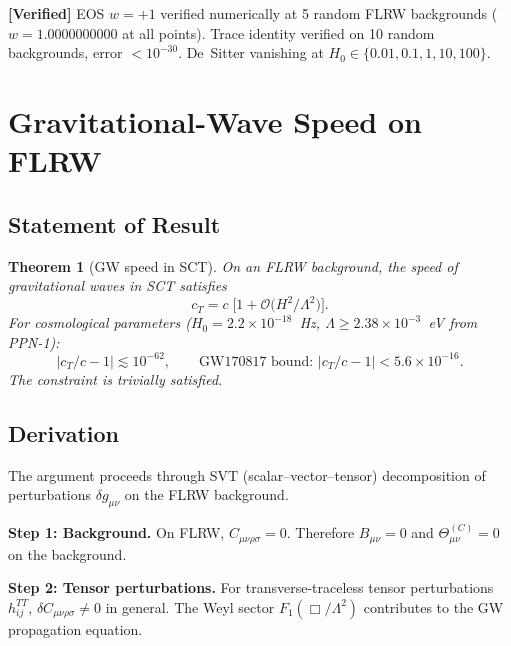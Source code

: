 \documentclass[11pt,a4paper]{article}
\theoremstyle{plain}
\newtheorem{theorem}{Theorem}[section]
\theoremstyle{definition}
\newcommand{\verified}[1]{%
  \par\smallskip\noindent
  \colorbox{green!10}{\parbox{\dimexpr\linewidth-2\fboxsep}{%
    \textcolor{green!50!black}{\textbf{[Verified]}} #1}}%
  \par\smallskip}
\begin{document}
\verified{EOS $w = +1$ verified numerically at 5 random FLRW backgrounds
($w = 1.0000000000$ at all points). Trace identity verified on 10 random
backgrounds, error $< 10^{-30}$. De~Sitter vanishing at
$H_0 \in \{0.01, 0.1, 1, 10, 100\}$.}

\section{Gravitational-Wave Speed on FLRW}\label{sec:gw}

\subsection{Statement of Result}

\begin{theorem}[GW speed in SCT]\label{thm:cT}
On an FLRW background, the speed of gravitational waves in SCT satisfies
\begin{equation}\label{eq:cT}
  \boxed{c_T = c\;\bigl[1 + \mathcal{O}\bigl(H^2/\Lambda^2\bigr)\bigr].}
\end{equation}
For cosmological parameters ($H_0 = 2.2 \times 10^{-18}$~Hz,
$\Lambda \geq 2.38 \times 10^{-3}$~eV from PPN-1):
\begin{equation}\label{eq:cT-numerical}
  |c_T/c - 1| \lesssim 10^{-62},
  \qquad\text{GW170817 bound: } |c_T/c - 1| < 5.6 \times 10^{-16}.
\end{equation}
The constraint is trivially satisfied.
\end{theorem}

\subsection{Derivation}

The argument proceeds through SVT (scalar--vector--tensor) decomposition
of perturbations $\delta g_{\mu\nu}$ on the FLRW background.

\textbf{Step 1: Background.}
On FLRW, $C_{\mu\nu\rho\sigma} = 0$. Therefore $B_{\mu\nu} = 0$
and $\Theta^{(C)}_{\mu\nu} = 0$ on the background.

\textbf{Step 2: Tensor perturbations.}
For transverse-traceless tensor perturbations $h_{ij}^{TT}$,
$\delta C_{\mu\nu\rho\sigma} \neq 0$ in general. The Weyl sector
$F_1(\Box/\Lambda^2)$ contributes to the GW propagation equation.
\end{document}
